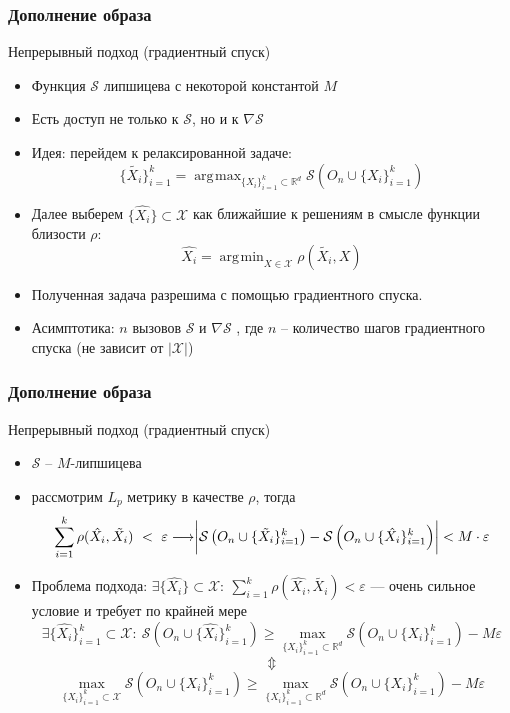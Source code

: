 \documentclass[10pt]{beamer}
\DeclareMathOperator*{\argmax}{\arg\!\max}
\DeclareMathOperator*{\argmin}{\arg\!\min}
\begin{document}
\begin{frame}
	\frametitle{Дополнение образа}
	\begin{block}{Непрерывный подход (градиентный спуск)}
		\begin{itemize}
			\item Функция $\mathcal{S}$ липшицева с некоторой константой $M$
			\item Есть доступ не только к $\mathcal{S}$, но и к $\nabla\mathcal{S}$ 
			\item Идея: перейдем к релаксированной задаче:
			 	$$\{\tilde{X_i}\}_{i=1}^k= \argmax_{\{X_i\}_{i=1}^k\subset\mathbb{R}^d} \mathcal{S}\left(O_n\cup\{X_i\}_{i=1}^k\right)$$
	 \item Далее выберем $\{\hat{X_i}\}\subset\mathcal{X}$ как ближайшие к решениям  в смысле функции близости $\rho$:
	 \vspace{-0.3cm}
	 $$\hat{X_i} =  \argmin_{X\in\mathcal{X}} \rho(\tilde{X_i}, X)$$
	  \vspace{-0.5cm}
	 \item Полученная задача разрешима с помощью градиентного спуска.
	 \item Асимптотика: $n$ вызовов $\mathcal{S}$ и $\nabla\mathcal{S}$ , где $n$ -- количество шагов градиентного спуска (не зависит от $|\mathcal{X}|$)
		\end{itemize}
	\end{block}
\end{frame}


\begin{frame}
	\frametitle{Дополнение образа}
	\begin{block}{Непрерывный подход (градиентный спуск)}
		\begin{itemize}
			\item $\mathcal{S}$ -- $M$-липшицева
			\item рассмотрим $L_p$ метрику в качестве $\rho$, тогда
			$$\sum_{i=1}^k\rho(\hat{X_i}, \tilde{X_i})~<~\varepsilon\longrightarrow \biggr{|}\mathcal{S}\left(O_n\cup\{\tilde{X_i}\}_{i=1}^k\right) - \mathcal{S}\left(O_n\cup\{\hat{X_i}\}_{i=1}^k\right)\biggr{|} < M\cdot\varepsilon$$
			
			\item Проблема подхода: $\exists\{\hat{X_i}\}\subset \mathcal{X}:~ \sum\limits_{i=1}^k\rho(\hat{X_i}, \tilde{X_i}) < \varepsilon$ --- очень сильное условие и требует по крайней мере
			$$\exists \{\hat{X_i}\}_{i=1}^k\subset\mathcal{X}:~ \mathcal{S}\left(O_n\cup\{\hat{X_i}\}_{i=1}^k\right) \geqslant \max_{\{X_i\}_{i=1}^k\subset\mathbb{R}^d} \mathcal{S}\left(O_n\cup\{X_i\}_{i=1}^k\right) - M\varepsilon$$
			$$\Updownarrow$$
			$$\max_{\{X_i\}_{i=1}^k\subset\mathcal{X}} \mathcal{S}\left(O_n\cup\{X_i\}_{i=1}^k\right) \geqslant \max_{\{X_i\}_{i=1}^k\subset\mathbb{R}^d} \mathcal{S}\left(O_n\cup\{X_i\}_{i=1}^k\right) - M\varepsilon$$
		\end{itemize}
	\end{block}
\end{frame}
\end{document}
